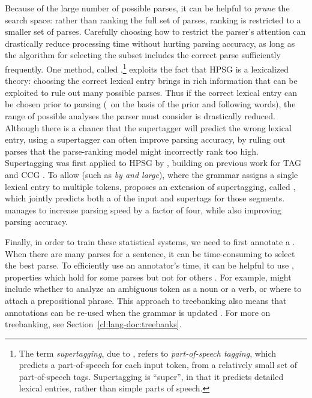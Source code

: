 \documentclass[output=paper,nonflat]{langsci/langscibook}
\begin{document}
Because of the large number of possible parses,
it can be helpful to \textit{prune} the search space:
rather than ranking the full set of parses,
ranking is restricted to a smaller set of parses.
Carefully choosing how to restrict the parser's attention 
can drastically reduce processing time without hurting parsing accuracy,
as long as the algorithm for selecting the subset
includes the correct parse sufficiently frequently.
One method, called \textit{},\footnote{%
	The term \textit{supertagging}, due to \citet{bangalore1999supertag},
	refers to \textit{part-of-speech tagging},
	which predicts a part-of-speech for each input token,
	from a relatively small set of part-of-speech tags.
	Supertagging is ``super'', in that it predicts detailed lexical entries,
	rather than simple parts of speech.
}
exploits the fact that HPSG is a lexicalized theory:
choosing the correct lexical entry brings in rich information
that can be exploited to rule out many possible parses.
Thus if the correct lexical entry can be chosen prior to parsing
(\eg\ on the basis of the prior and following words),
the range of possible analyses the parser must consider is drastically reduced.
Although there is a chance that the supertagger will predict the wrong lexical entry,
using a supertagger can often improve parsing accuracy,
by ruling out parses that the parse-ranking model might incorrectly rank too high.
Supertagging was first applied to HPSG by \citet{matsuzaki2007supertag},
building on previous work for TAG \citep{bangalore1999supertag}
and CCG \citep{clark2004supertag}.
To allow  (such as \textit{by and large}),
where the grammar assigns a single lexical entry to multiple tokens,
\citet{dridan2013ubertag} proposes an extension of supertagging, called \textit{},
which jointly predicts both a  of the input and supertags for those segments.
\citeauthor{dridan2013ubertag} manages to increase parsing speed by a factor of four,
while also improving parsing accuracy.


Finally, in order to train these statistical systems,
we need to first annotate a .
When there are many parses for a sentence,
it can be time-consuming to select the best parse.
To efficiently use an annotator's time,
it can be helpful to use \textit{},
properties which hold for some parses but not for others \citep{Carter:97}.
For example,  might include
whether to analyze an ambiguous token as a noun or a verb,
or where to attach a prepositional phrase.
This approach to treebanking also means that
annotations can be re-used when the grammar is updated
\citep{OFTM2004a-u,Fli:Oep:Ben:17}.
For more on treebanking, see Section~\ref{cl:lang-doc:treebanks}.%
\end{document}
